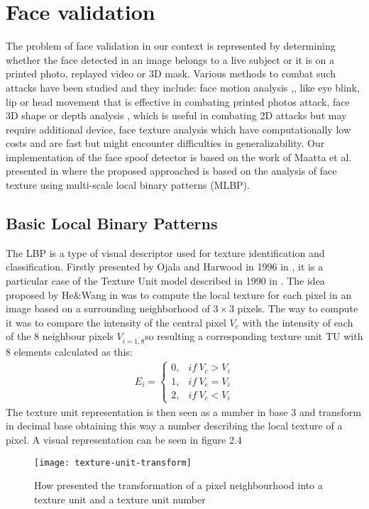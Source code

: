 \section{Face validation}
The problem of face validation in our context is represented by determining whether the face detected in an image belongs to a live subject or it is on a printed photo, replayed video or 3D mask. Various methods to combat such attacks have been studied and they include: face motion analysis \cite{BharadwajDVS13},\cite{PanSWL07},\cite{TirunagariPWISH15} like eye blink, lip or head movement that is effective in combating printed photos attack, face 3D shape or depth analysis \cite{MarsicoNRD12}, \cite{LagorioTCFS13} which is useful in combating 2D attacks but may require additional device, face texture analysis \cite{MaattaHP11} which have computationally low costs and are fast but might encounter difficulties in generalizability. Our implementation of the face spoof detector is based on the work of Maatta et al. presented in \cite{MaattaHP11} where the proposed approached is based on the analysis of face texture using multi-scale local binary patterns (MLBP).
\subsection{Basic Local Binary Patterns}
The LBP is a type of visual descriptor used for texture identification and classification. Firstly presented by Ojala and Harwood in 1996 in \cite{ojala1996comparative}, it is a particular case of the Texture Unit model described in 1990 in \cite{HeWang90}. The idea proposed by He\&Wang in \cite{HeWang90} was to compute the local texture for each pixel in an image based on a surrounding neighborhood of $3\times3$ pixels. The way to compute it was to compare the intensity of the central pixel $V_c$ with the intensity of each of the 8 neighbour pixels $V_{i=\overline{1,8}}$so resulting a corresponding texture unit TU with 8 elements calculated as this:
\begin{align}
	E_i = \begin{cases}
	0, & if\ V_c > V_i \\
	1, & if\ V_c = V_i \\
	2, & if\ V_c < V_i
	\end{cases}
\end{align}
The texture unit representation is then seen as a number in base 3 and transform in decimal base obtaining this way a number describing the local texture of a pixel.
A visual representation can be seen in figure 2.4
\begin{figure}[h]
	\begin{center}
		\texttt{[image: texture-unit-transform]}
	\end{center}
	\caption[Visual representation of texture unit transform]{How \cite{HeWang90} presented the transformation of a pixel neighbourhood into a texture unit and a texture unit number}
\end{figure}

